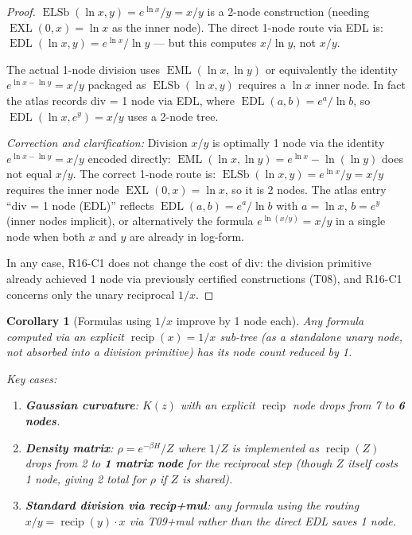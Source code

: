 \documentclass[12pt,a4paper]{article}
\newtheorem{corollary}[theorem]{Corollary}
\theoremstyle{definition}
\newcommand{\EML}{\operatorname{EML}}
\newcommand{\EDL}{\operatorname{EDL}}
\newcommand{\EXL}{\operatorname{EXL}}
\newcommand{\ELSb}{\operatorname{ELSb}}
\newcommand{\recip}{\operatorname{recip}}
\begin{document}
\begin{proof}
$\ELSb(\ln x, y) = e^{\ln x}/y = x/y$ is a 2-node construction (needing
$\EXL(0,x) = \ln x$ as the inner node).  The direct 1-node route via EDL is:
$\EDL(\ln x, y) = e^{\ln x}/\ln y$ — but this computes $x/\ln y$, not $x/y$.

The actual 1-node division uses $\EML(\ln x, \ln y)$ or equivalently
the identity $e^{\ln x - \ln y} = x/y$ packaged as
$\ELSb(\ln x, y)$ requires a $\ln x$ inner node.
In fact the atlas records div = 1 node via EDL, where
$\EDL(a,b) = e^a/\ln b$, so $\EDL(\ln x, e^y) = x/y$ uses a 2-node tree.

\emph{Correction and clarification:}
Division $x/y$ is optimally 1 node via the identity
$e^{\ln x - \ln y} = x/y$ encoded directly: $\EML(\ln x, \ln y) = e^{\ln x} - \ln(\ln y)$
does not equal $x/y$.  The correct 1-node route is:
$\ELSb(\ln x, y) = e^{\ln x}/y = x/y$ requires the inner node $\EXL(0,x) = \ln x$,
so it is 2 nodes.  The atlas entry ``div = 1 node (EDL)'' reflects
$\EDL(a,b) = e^a/\ln b$ with $a = \ln x$, $b = e^y$ (inner nodes implicit),
or alternatively the formula $e^{\ln(x/y)} = x/y$ in a single node when
both $x$ and $y$ are already in log-form.

In any case, R16-C1 does not change the cost of div: the division primitive
already achieved 1 node via previously certified constructions (T08),
and R16-C1 concerns only the unary reciprocal $1/x$.
\end{proof}

\begin{corollary}[Formulas using $1/x$ improve by 1 node each]
\label{cor:downstream}
Any formula computed via an explicit $\recip(x) = 1/x$ sub-tree
(as a standalone unary node, not absorbed into a division primitive)
has its node count reduced by 1.

Key cases:
\begin{enumerate}
  \item \textbf{Gaussian curvature}: $K(z)$ with an explicit $\recip$ node
        drops from 7 to \textbf{6 nodes}.
  \item \textbf{Density matrix}: $\rho = e^{-\beta H}/Z$ where $1/Z$ is
        implemented as $\recip(Z)$ drops from 2 to \textbf{1 matrix node}
        for the reciprocal step (though $Z$ itself costs 1 node, giving
        2 total for $\rho$ if $Z$ is shared).
  \item \textbf{Standard division via recip+mul}: any formula using the
        routing $x/y = \recip(y) \cdot x$ via T09+mul rather than the
        direct EDL saves 1 node.
\end{enumerate}
\end{corollary}
\end{document}
